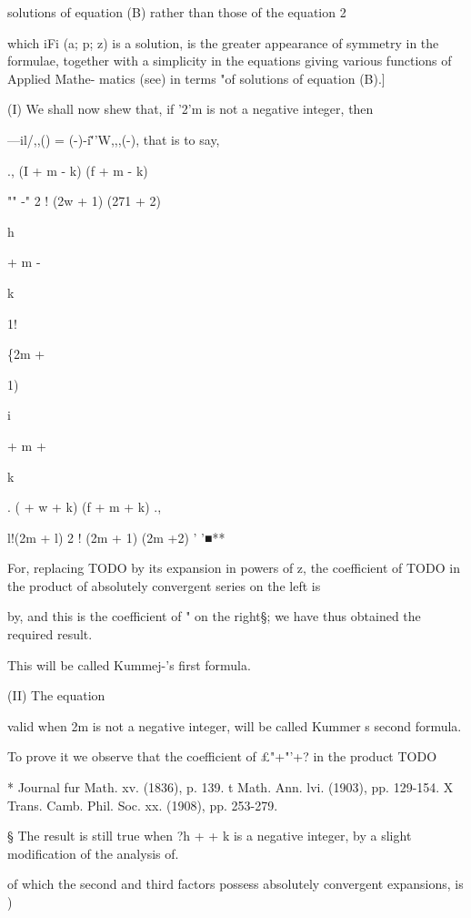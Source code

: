 solutions of equation (B) rather than those of the equation 2

which iFi (a; p; z) is a solution, is the greater appearance of
symmetry in the formulae, together with a simplicity in the equations
giving various functions of Applied Mathe- matics (see) in
terms "of solutions of equation (B).]


(I) We shall now shew that, if '2'm is not a negative integer, then

---il/,,() = (-)-i\~''W,,,(-), that is to say,

., (I + m - k) (f + m - k)

 "" -" 2 ! (2w + 1) (271 + 2)

h

+ m -

k

1!

\{2m +

1)

i

+ m +

k

  . ( + w + k) (f + m + k) ., 

l!(2m + l) 2 ! (2m + 1) (2m +2) ' '■**

For, replacing TODO by its expansion in powers of z, the coefficient
of TODO in the product of absolutely convergent series on the left is

by, and this is the coefficient of " on the right§; we have
thus obtained the required result.

This will be called Kummej-'s first formula.

(II) The equation

valid when 2m is not a negative integer, will be called Kummer s
second formula.

To prove it we observe that the coefficient of £"+"'+? in the product
TODO

* Journal fur Math. xv. (1836), p. 139. t Math. Ann. lvi. (1903), pp.
129-154. X Trans. Camb. Phil. Soc. xx. (1908), pp. 253-279.

§ The result is still true when ?h +  + k is a negative integer, by
a slight modification of the analysis of.

%
%

of which the second and third factors possess absolutely convergent
expansions, is )

